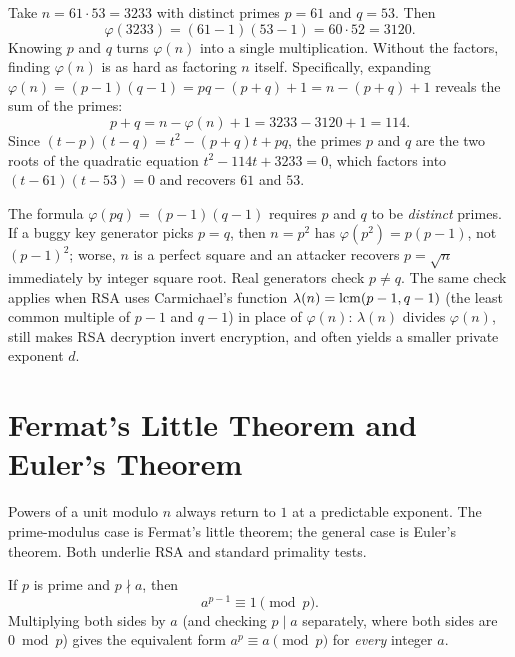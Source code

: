 \begin{example}
\label{ch04:ex-totient-rsa}
Take $n = 61 \cdot 53 = 3233$ with distinct primes $p = 61$ and $q = 53$. Then
\[
  \varphi(3233) = (61 - 1)(53 - 1) = 60 \cdot 52 = 3120.
\]
Knowing $p$ and $q$ turns $\varphi(n)$ into a single multiplication. Without the factors, finding
$\varphi(n)$ is as hard as factoring $n$ itself. Specifically, expanding
$\varphi(n) = (p-1)(q-1) = pq - (p + q) + 1 = n - (p + q) + 1$ reveals the sum of the primes:
\[
  p + q = n - \varphi(n) + 1 = 3233 - 3120 + 1 = 114.
\]
Since $(t - p)(t - q) = t^2 - (p+q)t + pq$, the primes $p$ and $q$ are the two roots of the
quadratic equation $t^2 - 114t + 3233 = 0$, which factors into $(t - 61)(t - 53) = 0$ and recovers
$61$ and $53$.
\end{example}

\begin{trapbox}
The formula $\varphi(pq) = (p-1)(q-1)$ requires $p$ and $q$ to be \emph{distinct} primes. If a buggy
key generator picks $p = q$, then $n = p^2$ has $\varphi(p^2) = p(p-1)$, not $(p-1)^2$; worse, $n$
is a perfect square and an attacker recovers $p = \sqrt{n}$ immediately by integer square root. Real
generators check $p \neq q$. The same check applies when RSA uses Carmichael's function
$\lambda(n) = \operatorname{lcm}(p-1, q-1)$ (the least common multiple of $p - 1$ and $q - 1$) in place of
$\varphi(n)$: $\lambda(n)$ divides $\varphi(n)$, still makes RSA decryption invert encryption, and
often yields a smaller private exponent $d$.
\end{trapbox}

\section{Fermat's Little Theorem and Euler's Theorem}
\label{ch04:fermat-euler}

Powers of a unit modulo $n$ always return to $1$ at a predictable exponent. The prime-modulus case
is Fermat's little theorem; the general case is Euler's theorem. Both underlie RSA and standard
primality tests.

\begin{theorem}
\label{ch04:thm-flt}
If $p$ is prime and $p \nmid a$, then
\[
  a^{p-1} \equiv 1 \pmod p.
\]
Multiplying both sides by $a$ (and checking $p \mid a$ separately, where both sides are $0 \bmod p$)
gives the equivalent form $a^p \equiv a \pmod p$ for \emph{every} integer $a$.
\end{theorem}

